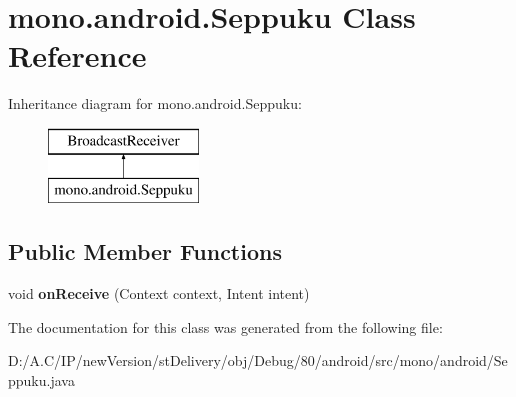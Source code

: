 \hypertarget{classmono_1_1android_1_1_seppuku}{}\section{mono.\+android.\+Seppuku Class Reference}
\label{classmono_1_1android_1_1_seppuku}
Inheritance diagram for mono.\+android.\+Seppuku\+:\begin{figure}[H]
\begin{center}
\leavevmode
\includegraphics[height=2.000000cm]{classmono_1_1android_1_1_seppuku}
\end{center}
\end{figure}
\subsection*{Public Member Functions}
\begin{DoxyCompactItemize}
\item 
\mbox{\label{classmono_1_1android_1_1_seppuku_abf493c6888eae9735c6b1fd052c25a2a}} 
void {\bfseries on\+Receive} (Context context, Intent intent)
\end{DoxyCompactItemize}


The documentation for this class was generated from the following file\+:\begin{DoxyCompactItemize}
\item 
D\+:/\+A.\+C/\+I\+P/new\+Version/st\+Delivery/obj/\+Debug/80/android/src/mono/android/Seppuku.\+java\end{DoxyCompactItemize}
